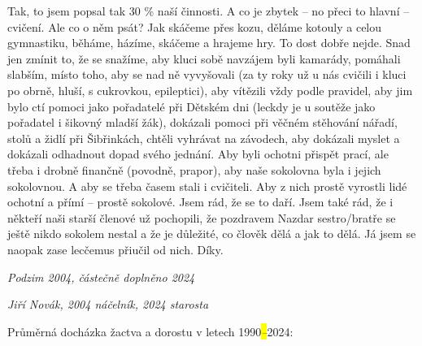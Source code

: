 Tak, to jsem popsal tak 30 \% naší činnosti. A co je zbytek -- no přeci
to hlavní -- cvičení. Ale co o něm psát? Jak skáčeme přes kozu, děláme
kotouly a celou gymnastiku, běháme, házíme, skáčeme a hrajeme hry. To
dost dobře nejde. Snad jen zmínit to, že se snažíme, aby kluci sobě
navzájem byli kamarády, pomáhali slabším, místo toho, aby se nad ně
vyvyšovali (za ty roky už u nás cvičili i kluci po obrně, hluší, s
cukrovkou, epileptici), aby vítězili vždy podle pravidel, aby jim bylo
ctí pomoci jako pořadatelé při Dětském dni (leckdy je u soutěže jako
pořadatel i šikovný mladší žák), dokázali pomoci při věčném stěhování
nářadí, stolů a židlí při Šibřinkách, chtěli vyhrávat na závodech, aby
dokázali myslet a dokázali odhadnout dopad svého jednání. Aby byli
ochotni přispět prací, ale třeba i drobně finančně (povodně, prapor),
aby naše sokolovna byla i jejich sokolovnou. A aby se třeba časem stali
i cvičiteli. Aby z nich prostě vyrostli lidé ochotní a přímí -- prostě
sokolové. Jsem rád, že se to daří. Jsem také rád, že i někteří naši
starší členové už pochopili, že pozdravem Nazdar sestro/bratře se ještě
nikdo sokolem nestal a že je důležité, co člověk dělá a jak to dělá. Já
jsem se naopak zase lecčemus přiučil od nich. Díky.

\emph{Podzim 2004, částečně doplněno 2024}

\emph{Jiří Novák, 2004 náčelník, 2024 starosta}

Průměrná docházka žactva a dorostu v letech 1990\emph{\hl{--}}2024:

